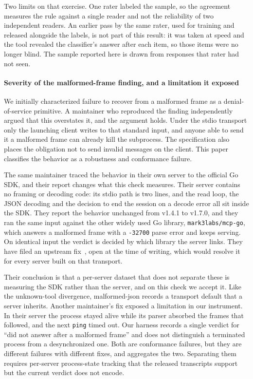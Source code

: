 Two limits on that exercise. One rater labeled the sample, so the agreement measures
the rule against a single reader and not the reliability of two independent readers.
An earlier pass by the same rater, used for training and released alongside the
labels, is not part of this result: it was taken at speed and the tool revealed the
classifier's answer after each item, so those items were no longer blind. The sample
reported here is drawn from responses that rater had not seen.

\paragraph{Severity of the malformed-frame finding, and a limitation it exposed}
We initially characterized failure to recover from a malformed frame as a
denial-of-service primitive. A maintainer who reproduced the finding independently
argued that this overstates it, and the argument holds. Under the stdio transport
only the launching client writes to that standard input, and anyone able to
send it a malformed frame can already kill the subprocess. The specification also
places the obligation not to send invalid messages on the client. This paper
classifies the behavior as a robustness and conformance failure.

The same maintainer traced the behavior in their own server to the official Go SDK,
and their report changes what this check measures. Their server contains no framing
or decoding code: its stdio path is two lines, and the read loop, the JSON decoding
and the decision to end the session on a decode error all sit inside the SDK. They
report the behavior unchanged from v1.4.1 to v1.7.0, and they ran the same input
against the other widely used Go library, \texttt{mark3labs/mcp-go}, which answers a
malformed frame with a \texttt{-32700} parse error and keeps serving. On identical
input the verdict is decided by which library the server links. They have filed an
upstream fix~\cite{gosdkpr1210}, open at the time of writing, which would resolve it
for every server built on that transport.

Their conclusion is that a per-server dataset that does not separate these is
measuring the SDK rather than the server, and on this check we accept it. Like the
unknown-tool divergence, \textsf{malformed-json} records a transport default that a
server inherits.
Another maintainer's fix exposed a limitation in our instrument. In their server the
process stayed alive while its parser absorbed the frames that followed, and the next
\texttt{ping} timed out. Our harness records a single verdict for
``did not answer after a malformed frame'' and does not distinguish a terminated
process from a desynchronized one. Both are conformance failures, but they are
different failures with different fixes, and \MalformedDiesRateCl{} aggregates
the two. Separating them requires per-server process-state tracking that the released
transcripts support but the current verdict does not encode.


